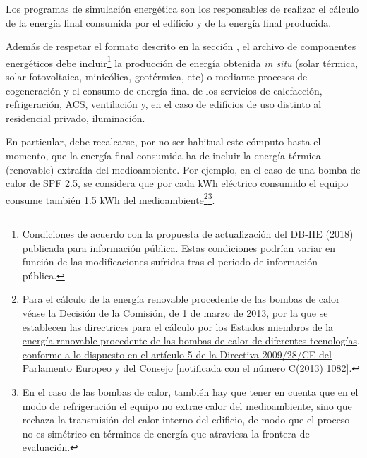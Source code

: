 \documentclass[10pt,notitlepage,oneside,a4paper]{article}
\begin{document}
Los programas de simulación energética son los responsables de realizar el cálculo de la energía final consumida por el edificio y de la energía final producida.

Además de respetar el formato descrito en la sección \textit{}, el archivo de componentes energéticos debe incluir\footnote{Condiciones de acuerdo con la propuesta de actualización del DB-HE (2018) publicada para información pública. Estas condiciones podrían variar en función de las modificaciones sufridas tras el periodo de información pública.} la producción de energía obtenida \textit{in situ} (solar térmica, solar fotovoltaica, minieólica, geotérmica, etc) o mediante procesos de cogeneración y el consumo de energía final de los servicios de calefacción, refrigeración, ACS, ventilación y, en el caso de edificios de uso distinto al residencial privado, iluminación.

En particular, debe recalcarse, por no ser habitual este cómputo hasta el momento, que la energía final consumida ha de incluir la energía térmica (renovable) extraída del medioambiente. Por ejemplo, en el caso de una bomba de calor de SPF 2.5, se considera que por cada kWh eléctrico consumido el equipo consume también 1.5 kWh del medioambiente\footnote{Para el cálculo de la energía renovable procedente de las bombas de calor véase la \href{https://www.boe.es/doue/2013/062/L00027-00035.pdf}{Decisión de la Comisión, de 1 de marzo de 2013, por la que se establecen las directrices para el cálculo por los Estados miembros de la energía renovable procedente de las bombas de calor de diferentes tecnologías, conforme a lo dispuesto en el artículo 5 de la Directiva 2009/28/CE del Parlamento Europeo y del Consejo [notificada con el número C(2013) 1082]}.}\footnote{En el caso de las bombas de calor, también hay que tener en cuenta que en el modo de refrigeración el equipo no extrae calor del medioambiente, sino que rechaza la transmisión del calor interno del edificio, de modo que el proceso no es simétrico en términos de energía que atraviesa la frontera de evaluación.}.
\end{document}

